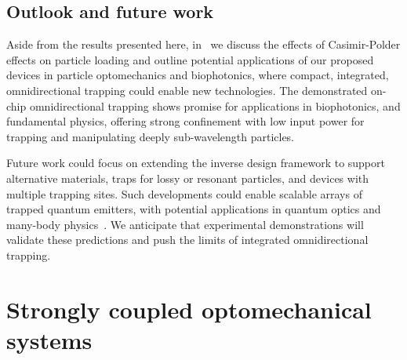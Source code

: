 \subsection*{Outlook and future work}

Aside from the results presented here, in~\cite{ownpub2} we discuss the effects of Casimir-Polder effects
 on particle loading and outline potential applications of our proposed devices in particle optomechanics
  and biophotonics, where compact, integrated, omnidirectional trapping could
   enable new technologies. The demonstrated on-chip omnidirectional trapping shows promise for applications in biophotonics, and fundamental physics,
    offering strong confinement with low input power for trapping and manipulating deeply sub-wavelength particles.

Future work could focus on extending the inverse design framework to support alternative materials, 
traps for lossy or resonant particles, and devices with multiple trapping sites.
 Such developments could enable scalable arrays of trapped quantum emitters, with potential applications
  in quantum optics and many-body physics~\cite{chang_colloquium_2018}. We anticipate that experimental demonstrations
   will validate these predictions and push the limits of integrated omnidirectional trapping.

\section{Strongly coupled optomechanical systems~\cite{ownpub5}}\label{sec:mech_strongly_coupled}

